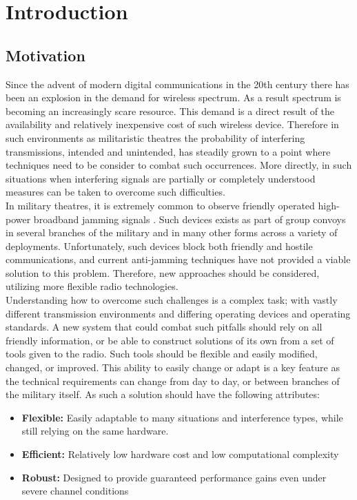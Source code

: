 \chapter{Introduction}
\label{ch:introduction}
\section{Motivation}

Since the advent of modern digital communications in the 20th century there has been an explosion in the demand for wireless spectrum.  As a result spectrum is becoming an increasingly scare resource\cite{scarcity}.  This demand is a direct result of the availability and relatively inexpensive cost of such wireless device.  Therefore in such environments as militaristic theatres the probability of interfering transmissions, intended and unintended, has steadily grown to a point where techniques need to be consider to combat such occurrences.  More directly, in such situations when interfering signals are partially or completely understood measures can be taken to overcome such difficulties.\\

In military theatres, it is extremely common to observe friendly operated high-power broadband jamming signals \cite{frater}.  Such devices exists as part of group convoys in several branches of the military and in many other forms across a variety of deployments.  Unfortunately, such devices block both friendly and hostile communications, and current anti-jamming techniques have not provided a viable solution to this problem.  Therefore, new approaches should be considered, utilizing more flexible radio technologies.\\

Understanding how to overcome such challenges is a complex task; with vastly different transmission environments and differing operating devices and operating standards.  A new system that could combat such pitfalls should rely on all friendly information, or be able to construct solutions of its own from a set of tools given to the radio.  Such tools should be flexible and easily modified, changed, or improved.  This ability to easily change or adapt is a key feature as the technical requirements can change from day to day, or between branches of the military itself. As such a solution should have the following attributes:

\begin{itemize}
\item \textbf{Flexible:} Easily adaptable to many situations and interference types, while still relying on the same hardware.

\item \textbf{Efficient:} Relatively low hardware cost and low computational complexity

\item \textbf{Robust:} Designed to provide guaranteed performance gains even under severe channel conditions

\end{itemize}


